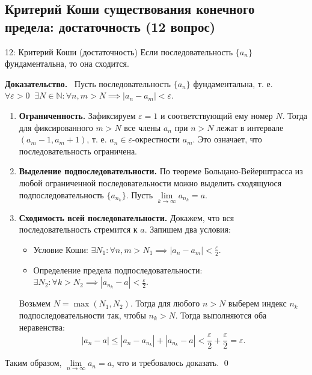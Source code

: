 \documentclass[a4paper,12pt]{article}
\newcommand{\myproof}{\textbf{Доказательство.}\ }
\begin{document}
	
	
	
	
	
	
	\newpage
	\subsection{Критерий Коши существования конечного предела: достаточность (12 вопрос)}
	
	\begin{theorembox}{12: Критерий Коши (достаточность)}
		Если последовательность $\{a_n\}$ фундаментальна, то она сходится.
	\end{theorembox}
	
	\vspace{0.5cm}
	\myproof
	Пусть последовательность $\{a_n\}$ фундаментальна, т. е. $\forall \varepsilon > 0 \;\; \exists N \in \mathbb{N} \colon \forall n, m > N \implies |a_n - a_m| < \varepsilon$.
	
	\begin{enumerate}
		\item \textbf{Ограниченность.} Зафиксируем $\varepsilon = 1$ и соответствующий ему номер $N$. Тогда для фиксированного $m > N$ все члены $a_n$ при $n > N$ лежат в интервале $(a_m - 1, a_m + 1)$, т. е. $a_n \in \varepsilon\text{-окрестности } a_m$. Это означает, что последовательность ограничена.
		
		\item \textbf{Выделение подпоследовательности.} По теореме Больцано-Вейерштрасса из любой ограниченной последовательности можно выделить сходящуюся подпоследовательность $\{a_{n_k}\}$. Пусть $\lim\limits_{k \to \infty} a_{n_k} = a$.
		
		\item \textbf{Сходимость всей последовательности.} Докажем, что вся последовательность стремится к $a$. Запишем два условия:
		\begin{itemize}
			\item Условие Коши: $\exists N_1 \colon \forall n, m > N_1 \implies |a_n - a_m| < \frac{\varepsilon}{2}$.
			\item Определение предела подпоследовательности: $\exists N_2 \colon \forall k > N_2 \implies |a_{n_k} - a| < \frac{\varepsilon}{2}$.
		\end{itemize}
		Возьмем $N = \max(N_1, N_2)$. Тогда для любого $n > N$ выберем индекс $n_k$ подпоследовательности так, чтобы $n_k > N$. Тогда выполняются оба неравенства:
		\[ |a_n - a| \le |a_n - a_{n_k}| + |a_{n_k} - a| < \frac{\varepsilon}{2} + \frac{\varepsilon}{2} = \varepsilon. \]
	\end{enumerate}
	Таким образом, $\lim\limits_{n \to \infty} a_n = a$, что и требовалось доказать. \qed
	
\end{document}
